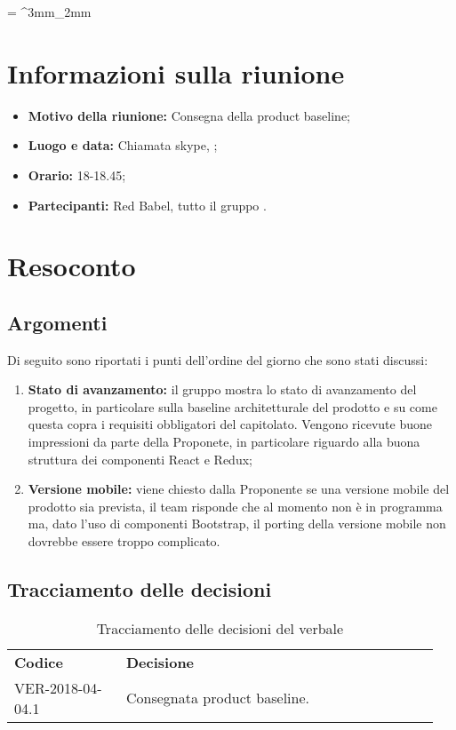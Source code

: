 \documentclass[VER-AAAA-MM-GG.tex]{subfiles}
\begin{document}
\tabulinesep = ^3mm_2mm
\chapter{Informazioni sulla riunione}
\begin{itemize}
	\item \textbf{Motivo della riunione:} Consegna della product baseline;
	\item \textbf{Luogo e data:} Chiamata skype, ;
	\item \textbf{Orario:} 18-18.45;
	\item \textbf{Partecipanti:} Red Babel, tutto il gruppo \gruppo.
\end{itemize}



\chapter{Resoconto}
\section{Argomenti}
Di seguito sono riportati i punti dell'ordine del giorno che sono stati discussi:
\begin{enumerate}
	\item \textbf{Stato di avanzamento:} il gruppo \gruppo mostra lo stato di avanzamento del progetto, in particolare sulla baseline architetturale del prodotto e su come questa copra i requisiti obbligatori del capitolato. Vengono ricevute buone impressioni da parte della Proponete, in particolare riguardo alla buona struttura dei componenti React e Redux;
	\item \textbf{Versione mobile:} viene chiesto dalla Proponente se una versione mobile del prodotto sia prevista, il team risponde che al momento non è in programma ma, dato l'uso di componenti Bootstrap, il porting della versione mobile non dovrebbe essere troppo complicato.
\end{enumerate}
\section{Tracciamento delle decisioni}
\begin{table}[H]
	\begin{center}
		\begin{tabu} to 
			\tableHeaderStyle
			\textbf{Codice} & \textbf{Decisione} \\
			VER-2018-04-04.1 & Consegnata product baseline. \\
		\end{tabu}
		\caption{Tracciamento delle decisioni del verbale}
	\end{center}
\end{table}
\end{document}
